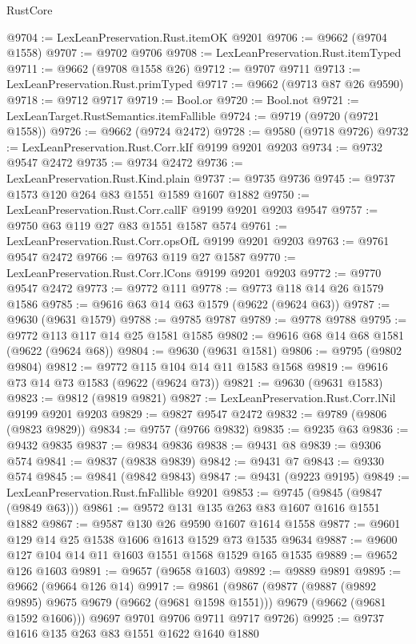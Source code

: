 \begin{lexlean}{RustCore}
\begin{coremodule}
@9704 := LexLeanPreservation.Rust.itemOK @9201
@9706 := @9662 (@9704 @1558)
@9707 := @9702 @9706
@9708 := LexLeanPreservation.Rust.itemTyped
@9711 := @9662 (@9708 @1558 @26)
@9712 := @9707 @9711
@9713 := LexLeanPreservation.Rust.primTyped
@9717 := @9662 (@9713 @87 @26 @9590)
@9718 := @9712 @9717
@9719 := Bool.or
@9720 := Bool.not
@9721 := LexLeanTarget.RustSemantics.itemFallible
@9724 := @9719 (@9720 (@9721 @1558))
@9726 := @9662 (@9724 @2472)
@9728 := @9580 (@9718 @9726)
@9732 := LexLeanPreservation.Rust.Corr.kIf @9199 @9201 @9203
@9734 := @9732 @9547 @2472
@9735 := @9734 @2472
@9736 := LexLeanPreservation.Rust.Kind.plain
@9737 := @9735 @9736
@9745 := @9737 @1573 @120 @264 @83 @1551 @1589 @1607 @1882
@9750 := LexLeanPreservation.Rust.Corr.callF @9199 @9201 @9203 @9547
@9757 := @9750 @63 @119 @27 @83 @1551 @1587 @574
@9761 := LexLeanPreservation.Rust.Corr.opsOfL @9199 @9201 @9203
@9763 := @9761 @9547 @2472
@9766 := @9763 @119 @27 @1587
@9770 := LexLeanPreservation.Rust.Corr.lCons @9199 @9201 @9203
@9772 := @9770 @9547 @2472
@9773 := @9772 @111
@9778 := @9773 @118 @14 @26 @1579 @1586
@9785 := @9616 @63 @14 @63 @1579 (@9622 (@9624 @63))
@9787 := @9630 (@9631 @1579)
@9788 := @9785 @9787
@9789 := @9778 @9788
@9795 := @9772 @113 @117 @14 @25 @1581 @1585
@9802 := @9616 @68 @14 @68 @1581 (@9622 (@9624 @68))
@9804 := @9630 (@9631 @1581)
@9806 := @9795 (@9802 @9804)
@9812 := @9772 @115 @104 @14 @11 @1583 @1568
@9819 := @9616 @73 @14 @73 @1583 (@9622 (@9624 @73))
@9821 := @9630 (@9631 @1583)
@9823 := @9812 (@9819 @9821)
@9827 := LexLeanPreservation.Rust.Corr.lNil @9199 @9201 @9203
@9829 := @9827 @9547 @2472
@9832 := @9789 (@9806 (@9823 @9829))
@9834 := @9757 (@9766 @9832)
@9835 := @9235 @63
@9836 := @9432 @9835
@9837 := @9834 @9836
@9838 := @9431 @8
@9839 := @9306 @574
@9841 := @9837 (@9838 @9839)
@9842 := @9431 @7
@9843 := @9330 @574
@9845 := @9841 (@9842 @9843)
@9847 := @9431 (@9223 @9195)
@9849 := LexLeanPreservation.Rust.fnFallible @9201
@9853 := @9745 (@9845 (@9847 (@9849 @63)))
@9861 := @9572 @131 @135 @263 @83 @1607 @1616 @1551 @1882
@9867 := @9587 @130 @26 @9590 @1607 @1614 @1558
@9877 := @9601 @129 @14 @25 @1538 @1606 @1613 @1529 @73 @1535 @9634
@9887 := @9600 @127 @104 @14 @11 @1603 @1551 @1568 @1529 @165 @1535
@9889 := @9652 @126 @1603
@9891 := @9657 (@9658 @1603)
@9892 := @9889 @9891
@9895 := @9662 (@9664 @126 @14)
@9917 := @9861
    (@9867
      (@9877
        (@9887 (@9892 @9895) @9675 @9679 (@9662 (@9681 @1598 @1551)))
        @9679
        (@9662 (@9681 @1592 @1606)))
      @9697
      @9701
      @9706
      @9711
      @9717
      @9726)
@9925 := @9737 @1616 @135 @263 @83 @1551 @1622 @1640 @1880

\end{coremodule}
\end{lexlean}
